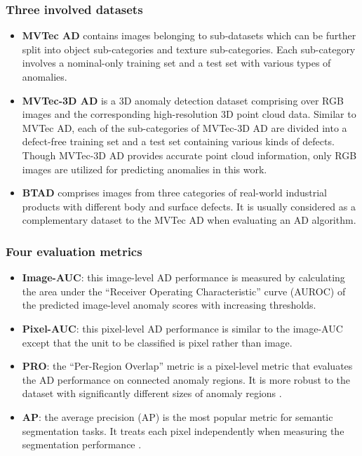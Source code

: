 \documentclass[lettersize,journal]{IEEEtran}
\begin{document}
\subsubsection{Three involved datasets}
\begin{itemize}
  \item
        \textbf{MVTec AD} \cite{Bergmann_2019_CVPR} contains  images belonging to 
        sub-datasets which can be further split into  object sub-categories and 
        texture sub-categories. Each sub-category involves a nominal-only training set and a
        test set with various types of anomalies.
  \item
        \textbf{MVTec-3D AD} \cite{Bergmann_2022} is a 3D anomaly detection dataset
        comprising over  RGB images and the corresponding high-resolution 3D point
        cloud data. Similar to MVTec AD, each of the  sub-categories of MVTec-3D AD are
        divided into a defect-free training set and a test set containing various kinds of
        defects. Though MVTec-3D AD provides accurate point cloud information, only RGB
        images are utilized for predicting anomalies in this work.
  \item
        \textbf{BTAD} \cite{mishra2021vt} comprises  images from three categories of
        real-world industrial products with different body and surface defects. It is
        usually considered as a complementary dataset to the MVTec AD when evaluating an AD
        algorithm.
\end{itemize}

\subsubsection{Four evaluation metrics}
\begin{itemize}
  \item
        \textbf{Image-AUC}: this image-level AD performance is measured by calculating the
        area under the ``Receiver Operating Characteristic'' curve (AUROC) of the predicted
        image-level anomaly scores with increasing thresholds.
  \item
        \textbf{Pixel-AUC}: this pixel-level AD performance is similar to the image-AUC
        except that the unit to be classified is pixel rather than image.
  \item
        \textbf{PRO}: the ``Per-Region Overlap'' metric is a pixel-level metric that evaluates
        the AD performance on connected anomaly regions. It is more robust to the dataset
        with significantly different sizes of anomaly regions \cite{bergmann2020uninformed}.
  \item
        \textbf{AP}: the average precision (AP) is the most popular metric for semantic
        segmentation tasks. It treats each pixel independently when measuring the
        segmentation performance \cite{saito2015precision}.
\end{itemize}
\end{document}
